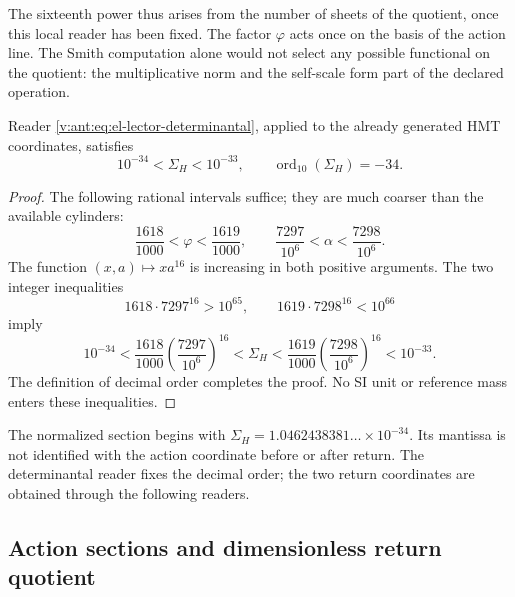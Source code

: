 The sixteenth power thus arises from the number of sheets of the quotient,
once this local reader has been fixed. The factor \(\varphi\) acts once on
the basis of the action line. The Smith computation alone would not
select any possible functional on the quotient: the multiplicative
norm and the self-scale form part of the declared operation.

\begin{theorem}
Reader \eqref{v:ant:eq:el-lector-determinantal}, applied to the already generated
HMT coordinates, satisfies
\begin{equation}
 10^{-34}<\Sigma_H<10^{-33},\qquad
 \operatorname{ord}_{10}(\Sigma_H)=-34.
 \label{v:ant:eq:el-decada}
\end{equation}
\end{theorem}
\begin{proof}
The following rational intervals suffice; they are much coarser than the available
cylinders:
\[
 \frac{1618}{1000}<\varphi<\frac{1619}{1000},\qquad
 \frac{7297}{10^6}<\alpha<\frac{7298}{10^6}.
\]
The function \((x,a)\mapsto xa^{16}\) is increasing in both positive
arguments. The two integer inequalities
\[
 1618\cdot7297^{16}>10^{65},\qquad
 1619\cdot7298^{16}<10^{66}
\]
imply
\[
 10^{-34}
 <\frac{1618}{1000}\left(\frac{7297}{10^6}\right)^{16}
 <\Sigma_H
 <\frac{1619}{1000}\left(\frac{7298}{10^6}\right)^{16}
 <10^{-33}.
\]
The definition of decimal order completes the proof. No SI
unit or reference mass enters these inequalities.
\end{proof}

The normalized section begins with
\(\Sigma_H=1.0462438381\ldots\times10^{-34}\). Its mantissa is not
identified with the action coordinate before or after return.
The determinantal reader fixes the decimal order; the two return
coordinates are obtained through the following readers.


\subsection{Action sections and dimensionless return quotient}

